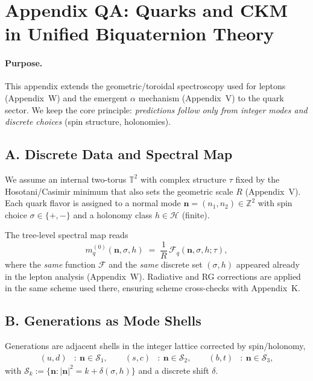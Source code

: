 \appendix
\section*{Appendix QA: Quarks and CKM in Unified Biquaternion Theory}

\paragraph{Purpose.}
This appendix extends the geometric/toroidal spectroscopy used for leptons (Appendix~W) and
the emergent $\alpha$ mechanism (Appendix~V) to the quark sector. We keep the core principle:
\emph{predictions follow only from integer modes and discrete choices} (spin structure, holonomies).

\subsection*{A. Discrete Data and Spectral Map}
We assume an internal two-torus $\mathbb{T}^2$ with complex structure $\tau$ fixed by the
Hosotani/Casimir minimum that also sets the geometric scale $R$ (Appendix~V).
Each quark flavor is assigned to a normal mode $\mathbf{n}=(n_1,n_2)\in\mathbb{Z}^2$ with spin choice
$\sigma\in\{+,-\}$ and a holonomy class $h\in\mathcal{H}$ (finite). 



The tree-level spectral map reads
\begin{equation}
  m^{(0)}_{q}(\mathbf n,\sigma,h) \;=\; \frac{1}{R}\,\mathcal{F}_q\!\left(\mathbf n,\sigma,h;\tau\right),
  \label{eq:QA:m_tree}
\end{equation}
where the \emph{same} function $\mathcal{F}$ and the \emph{same} discrete set $(\sigma,h)$
appeared already in the lepton analysis (Appendix~W). Radiative and RG corrections are applied
in the same scheme used there, ensuring scheme cross-checks with Appendix~K.

\subsection*{B. Generations as Mode Shells}
Generations are adjacent shells in the integer lattice corrected by spin/holonomy,
\begin{align}
  (u,d) &: \ \mathbf n\in\mathcal S_1,\qquad
  (s,c) &: \ \mathbf n\in\mathcal S_2,\qquad
  (b,t) &: \ \mathbf n\in\mathcal S_3,
\end{align}
with $\mathcal S_k := \{ \mathbf n : |\mathbf n|^2 = k + \delta(\sigma,h)\}$ and a discrete shift $\delta$.


